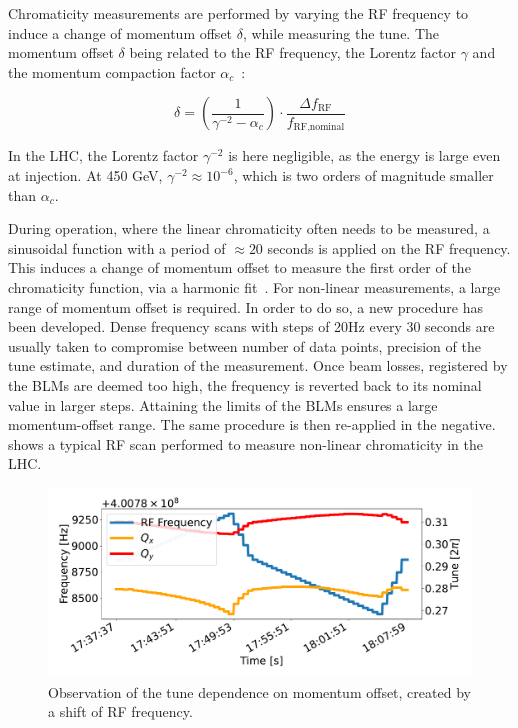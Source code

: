 Chromaticity measurements are performed by varying
the RF frequency to induce a change of momentum offset $\delta$, while measuring the tune. The
momentum offset $\delta$ being related to the RF frequency, the Lorentz factor $\gamma$ and the
momentum compaction factor $\alpha_c$~\cite{wiedemann_particle_1999,carmignani_ipac_2019}:

\begin{equation}
    \delta = \left(\frac{1}{\gamma^{-2} - \alpha_c}\right) \cdot \frac{\Delta f_{\text{RF}}}{f_{\text{RF,nominal}}}
    \label{eq:dpp_rf}
\end{equation}

In the LHC, the Lorentz factor $\gamma^{-2}$ is here negligible, as the energy is large even at
injection.  At 450 GeV, $\gamma^{-2} \approx 10^{-6}$, which is two orders of magnitude smaller than
$\alpha_c$.

During operation, where the linear chromaticity often needs to be measured, a sinusoidal function
with a period of $\approx 20$ seconds is applied on the RF frequency. This induces a change of
momentum offset to measure the first order of the chromaticity function, via a harmonic
fit~\cite{fuchsberger_ibic_2016}. For non-linear measurements, a large range of momentum offset is
required. In order to do so, a new procedure has been developed. Dense frequency scans with steps of
20Hz every 30 seconds are usually taken to compromise between number of data points, precision of
the tune estimate, and duration of the measurement. Once beam losses, registered by the BLMs are
deemed too high, the frequency is reverted back to its nominal value in larger steps. Attaining the
limits of the BLMs ensures a large momentum-offset range. The same procedure is then re-applied in
the negative.
 shows a typical RF scan performed to measure non-linear chromaticity
in the LHC.

\begin{figure}[H]
    \centering
    \includegraphics[width=1\textwidth]{images/rf_scan.pdf}
    \caption{Observation of the tune dependence on momentum offset, created by a shift of RF
             frequency.}
    \label{fig:measurements:rf_scan}
\end{figure}


